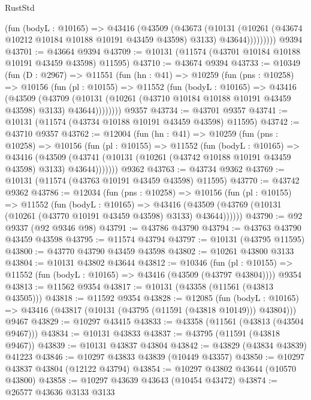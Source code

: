 \begin{lexlean}{RustStd}
\begin{coremodule}
              (fun (bodyL : @10165) =>
              @43416
                (@43509
                  (@43673
                    (@10131
                      (@10261 (@43674 @10212 @10184 @10188 @10191 @43459 @43598) @3133)
                      @43644)))))))))
    @9394
@43701 := @43664 @9394
@43709 := @10131 (@11574 (@43701 @10184 @10188 @10191 @43459 @43598) @11595)
@43710 := @43674 @9394
@43733 := @10349
    (fun (D : @2967) =>
    @11551
      (fun (hn : @41) =>
      @10259
        (fun (pns : @10258) =>
        @10156
          (fun (pl : @10155) =>
          @11552
            (fun (bodyL : @10165) =>
            @43416
              (@43509
                (@43709
                  (@10131 (@10261 (@43710 @10184 @10188 @10191 @43459 @43598) @3133) @43644))))))))
    @9357
@43734 := @43701 @9357
@43741 := @10131 (@11574 (@43734 @10188 @10191 @43459 @43598) @11595)
@43742 := @43710 @9357
@43762 := @12004
    (fun (hn : @41) =>
    @10259
      (fun (pns : @10258) =>
      @10156
        (fun (pl : @10155) =>
        @11552
          (fun (bodyL : @10165) =>
          @43416
            (@43509
              (@43741 (@10131 (@10261 (@43742 @10188 @10191 @43459 @43598) @3133) @43644)))))))
    @9362
@43763 := @43734 @9362
@43769 := @10131 (@11574 (@43763 @10191 @43459 @43598) @11595)
@43770 := @43742 @9362
@43786 := @12034
    (fun (pns : @10258) =>
    @10156
      (fun (pl : @10155) =>
      @11552
        (fun (bodyL : @10165) =>
        @43416 (@43509 (@43769 (@10131 (@10261 (@43770 @10191 @43459 @43598) @3133) @43644))))))
@43790 := @92 @9337 (@92 @9346 @98)
@43791 := @43786 @43790
@43794 := @43763 @43790 @43459 @43598
@43795 := @11574 @43794
@43797 := @10131 (@43795 @11595)
@43800 := @43770 @43790 @43459 @43598
@43802 := @10261 @43800 @3133
@43804 := @10131 @43802 @43644
@43812 := @10346
    (fun (pl : @10155) => @11552 (fun (bodyL : @10165) => @43416 (@43509 (@43797 @43804))))
    @9354
@43813 := @11562 @9354
@43817 := @10131 (@43358 (@11561 (@43813 @43505)))
@43818 := @11592 @9354
@43828 := @12085
    (fun (bodyL : @10165) => @43416 (@43817 (@10131 (@43795 (@11591 (@43818 @10149))) @43804)))
    @9467
@43829 := @10297 @43415
@43833 := @43358 (@11561 (@43813 (@43504 @9467)))
@43834 := @10131 @43833
@43837 := @43795 (@11591 (@43818 @9467))
@43839 := @10131 @43837 @43804
@43842 := @43829 (@43834 @43839) @41223
@43846 := @10297 @43833 @43839 (@10449 @43357)
@43850 := @10297 @43837 @43804 (@12122 @43794)
@43854 := @10297 @43802 @43644 (@10570 @43800)
@43858 := @10297 @43639 @43643 (@10454 @43472)
@43874 := @26577
    @43636
    @3133
    @3133

\end{coremodule}
\end{lexlean}

